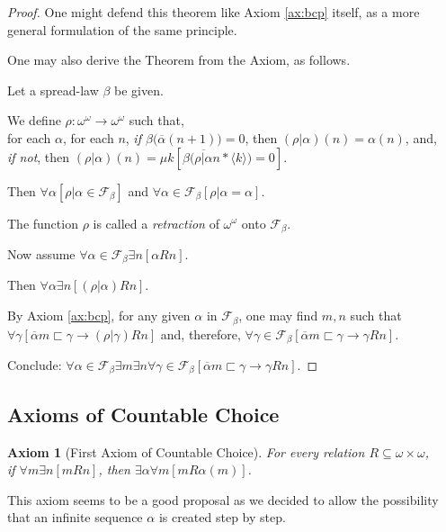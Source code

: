 \documentclass[a4paper]{amsart}
\theoremstyle{plain}
\newtheorem{axiom}{Axiom}
\begin{document}
\begin{proof} One might defend this theorem like Axiom \ref{ax:bcp} itself, as a more general formulation of the same principle.

One may also derive the Theorem from the Axiom, as follows.

Let a spread-law $\beta$ be given.  

\smallskip We define $\rho:\omega^\omega\rightarrow \omega^\omega$ such that, \\for each $\alpha$, for each $n$, {\it if $\beta\bigl(\overline \alpha(n+1)\bigr)=0$}, then $(\rho|\alpha)(n)=\alpha (n)$, and, \\ {\it if not}, then $(\rho|\alpha)(n)=\mu k[\beta\bigl(\overline{\rho|\alpha}n\ast\langle k \rangle\bigr)=0]$.

Then $\forall \alpha[\rho|\alpha\in \mathcal{F}_\beta]$ and $\forall \alpha \in \mathcal{F}_\beta[\rho|\alpha=\alpha]$.

The function $\rho$ is called a {\it retraction} of $\omega^\omega$ onto $\mathcal{F}_\beta$.

\smallskip Now assume $\forall \alpha \in \mathcal{F}_\beta\exists n[\alpha R n]$.

Then $\forall \alpha \exists n[(\rho|\alpha)Rn]$.

 By Axiom \ref{ax:bcp}, for any given $\alpha$ in $\mathcal{F}_\beta$, one may find $m,n$ such that \\$\forall \gamma[\overline \alpha m\sqsubset \gamma \rightarrow (\rho|\gamma)Rn]$ and, therefore, $\forall \gamma \in \mathcal{F}_\beta[\overline\alpha m \sqsubset \gamma \rightarrow \gamma R n]$.

Conclude: $\forall \alpha\in \mathcal{F}_\beta\exists m\exists n \forall \gamma\in \mathcal{F}_\beta[\overline\alpha m \sqsubset \gamma\rightarrow \gamma Rn]$.
\end{proof}
\subsection{Axioms of Countable Choice}


\begin{axiom}[First Axiom of Countable Choice]\label{ax:firstchoice} For every relation $R\subseteq \omega\times\omega$, \\if $\forall m \exists n [mRn]$, then $\exists \alpha\forall m[m R\alpha(m)]$. \end{axiom}
This axiom seems to be a good proposal as we decided to allow the possibility that an infinite sequence $\alpha$ is created step by step. 
\end{document}
